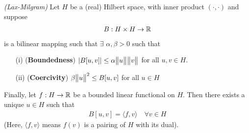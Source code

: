 \documentclass[10pt,a4paper]{report}
\begin{document}
\thm \emph{(Lax-Milgram)} Let $H$ be a (real) Hilbert space, with inner product $(\cdot, \cdot)$ and suppose
\begin{align*}
B : H\times H \rightarrow \mathbb{R}
\end{align*}
is a bilinear mapping such that $\exists$ $\alpha, \beta >0$ such that
\begin{itemize}
\item[(i)] (\textbf{Boundedness}) $|B[u,v]| \leq \alpha \bigl\lVert u\bigr\rVert_{} \bigl\lVert v\bigr\rVert_{}$ for all $u,v \in H$. 
\item[(ii)] (\textbf{Coercivity}) $\beta \bigl\lVert u\bigr\rVert_{}^2 \leq B[u,v]$ for all $u \in H$ 
\end{itemize}
Finally, let $f: H\rightarrow \mathbb{R}$ be a bounded linear functional on $H$. Then there exists a unique $u\in H$ such that
\begin{align*}
B[u,v] = \langle f, v\rangle \quad \forall v \in H
\end{align*}
(Here, $\langle f,v\rangle$ means $f(v)$ is a pairing of $H$ with its dual).
\end{document}
